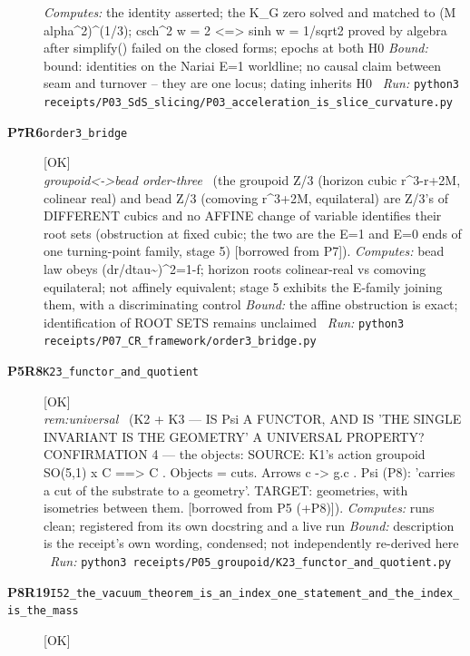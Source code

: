 \begin{description}
\emph{Computes:} the identity asserted; the K\_G zero solved and matched to (M alpha\textasciicircum{}2)\textasciicircum{}(1/3); csch\textasciicircum{}2 w = 2 <=> sinh w = 1/sqrt2 proved by algebra after simplify() failed on the closed forms; epochs at both H0
 \emph{Bound:} bound: identities on the Nariai E=1 worldline; no causal claim between seam and turnover -- they are one locus; dating inherits H0
\ \emph{Run:} \texttt{python3 receipts/P03\_SdS\_slicing/P03\_acceleration\_is\_slice\_curvature.py}
\item[\rcptlabel{order3_bridge}{P7R6}\textbf{P7R6}\quad\texttt{order3\_bridge}]\hfill\textsf{[OK]}\\
\textit{groupoid<->bead order-three} \ (the groupoid Z/3 (horizon cubic r\textasciicircum{}3-r+2M, colinear real) and bead Z/3 (comoving r\textasciicircum{}3+2M, equilateral) are Z/3's of DIFFERENT cubics and no AFFINE change of variable identifies their root sets (obstruction at fixed cubic; the two are the E=1 and E=0 ends of one turning-point family, stage 5) [borrowed from P7]). 
\emph{Computes:} bead law obeys (dr/dtau\textasciitilde{})\textasciicircum{}2=1-f; horizon roots colinear-real vs comoving equilateral; not affinely equivalent; stage 5 exhibits the E-family joining them, with a discriminating control
 \emph{Bound:} the affine obstruction is exact; identification of ROOT SETS remains unclaimed
\ \emph{Run:} \texttt{python3 receipts/P07\_CR\_framework/order3\_bridge.py}
\item[\rcptlabel{K23_functor_and_quotient}{P5R8}\textbf{P5R8}\quad\texttt{K23\_functor\_and\_quotient}]\hfill\textsf{[OK]}\\
\textit{rem:universal} \ (K2 + K3 --- IS Psi A FUNCTOR, AND IS 'THE SINGLE INVARIANT IS THE GEOMETRY' A UNIVERSAL PROPERTY? CONFIRMATION 4 --- the objects: SOURCE: K1's action groupoid SO(5,1) \textbar{}x C ==> C . Objects = cuts. Arrows c -> g.c . Psi (P8): 'carries a cut of the substrate to a geometry'. TARGET: geometries, with isometries between them. [borrowed from P5 (+P8)]). 
\emph{Computes:} runs clean; registered from its own docstring and a live run
 \emph{Bound:} description is the receipt's own wording, condensed; not independently re-derived here
\ \emph{Run:} \texttt{python3 receipts/P05\_groupoid/K23\_functor\_and\_quotient.py}
\item[\rcptlabel{I52_the_vacuum_theorem_is_an_index_one_statement_and_the_index_is_the_mass}{P8R19}\textbf{P8R19}\quad\texttt{I52\_the\_vacuum\_theorem\_is\_an\_index\_one\_statement\_and\_the\_index\_is\_the\_mass}]\hfill\textsf{[OK]}\\

\end{description}
